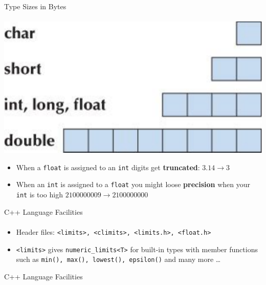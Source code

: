 \documentclass[presentation]{beamer}
\begin{document}
\begin{frame}{Type Sizes in Bytes}
\framesubtitle{}

\includegraphics[scale=.5]{images/typesizes}

\begin{itemize}
\item When a \texttt{float} is assigned to an \texttt{int} digits get
  \textbf{truncated}: $3.14 \rightarrow 3$
\item When an \texttt{int} is assigned to a \texttt{float} you might
  loose \textbf{precision} when your \texttt{int} is too high $2100000009
  \rightarrow 2100000000$
\end{itemize}

\end{frame}

\begin{frame}{C++ Language Facilities}
\framesubtitle{}

\begin{itemize}
\item Header files: \texttt{<limits>, <climits>, <limits.h>, <float.h>}
\item \texttt{<limits>} gives \texttt{numeric\_limits<T>} for built-in types
  with member functions such as \texttt{min(), max(), lowest(), epsilon()} and
  many more \ldots 
\end{itemize}

\end{frame}

\begin{frame}{C++ Language Facilities}
\framesubtitle{}
\scalebox{0.8}{

}
\end{frame}
\end{document}
